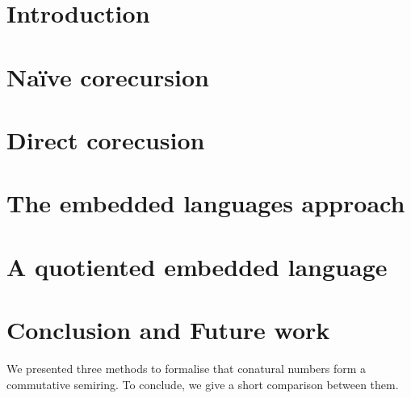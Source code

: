 \documentclass[sigplan, screen, natbib=false, review]{acmart}
\begin{document}

\maketitle

\section{Introduction}\label{sec:intro}


\section{Naïve corecursion}\label{sec:problem}



\section{Direct corecusion}\label{sec:direct}



\section{The embedded languages approach}\label{sec:dsl}



\section{A quotiented embedded language}\label{sec:quotiented}



\section{Conclusion and Future work}

We presented three methods to formalise that conatural numbers form a commutative semiring. To conclude,
we give a short comparison between them.
\end{document}
